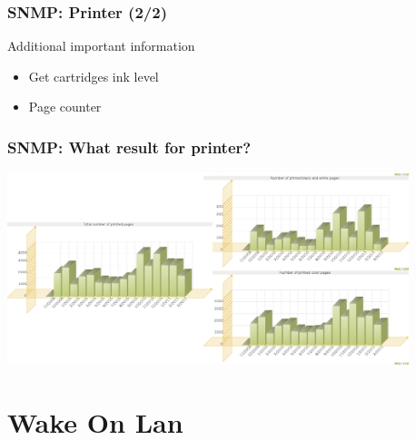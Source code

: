 \documentclass{beamer}
\begin{document}
\begin{frame}
    \frametitle{SNMP: Printer (2/2)}

    \begin{block}{Additional important information}
    \begin{itemize}
    \item Get cartridges ink level
    \item Page counter
    \end{itemize}
    \end{block}
\end{frame}

\begin{frame}
    \frametitle{SNMP: What result for printer?}

    \begin{center}
    \includegraphics[width=11.7cm]{./pics/printer_graph.png}
    \end{center}
\end{frame}

\section{Wake On Lan}
\end{document}
